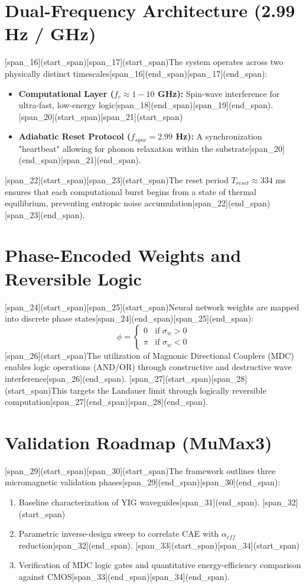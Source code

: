 \documentclass[11pt,a4paper]{article}
\begin{document}
\section{Dual-Frequency Architecture (2.99 Hz / GHz)}
[span_16](start_span)[span_17](start_span)The system operates across two physically distinct timescales[span_16](end_span)[span_17](end_span):
\begin{itemize}
    [span_18](start_span)[span_19](start_span)\item \textbf{Computational Layer ($f_{c} \approx 1-10$ GHz):} Spin-wave interference for ultra-fast, low-energy logic[span_18](end_span)[span_19](end_span).
    [span_20](start_span)[span_21](start_span)\item \textbf{Adiabatic Reset Protocol ($f_{sync} = 2.99$ Hz):} A synchronization "heartbeat" allowing for phonon relaxation within the substrate[span_20](end_span)[span_21](end_span).
\end{itemize}

[span_22](start_span)[span_23](start_span)The reset period $T_{reset} \approx 334$ ms ensures that each computational burst begins from a state of thermal equilibrium, preventing entropic noise accumulation[span_22](end_span)[span_23](end_span).

\section{Phase-Encoded Weights and Reversible Logic}
[span_24](start_span)[span_25](start_span)Neural network weights are mapped into discrete phase states[span_24](end_span)[span_25](end_span):
\begin{equation}
\phi = \begin{cases} 0 & \text{if } \sigma_{w} > 0 \\ \pi & \text{if } \sigma_{w} < 0 \end{cases}
\end{equation}
[span_26](start_span)The utilization of Magnonic Directional Couplers (MDC) enables logic operations (AND/OR) through constructive and destructive wave interference[span_26](end_span). [span_27](start_span)[span_28](start_span)This targets the Landauer limit through logically reversible computation[span_27](end_span)[span_28](end_span).

\section{Validation Roadmap (MuMax3)}
[span_29](start_span)[span_30](start_span)The framework outlines three micromagnetic validation phases[span_29](end_span)[span_30](end_span):
\begin{enumerate}
    [span_31](start_span)\item Baseline characterization of YIG waveguides[span_31](end_span).
    [span_32](start_span)\item Parametric inverse-design sweep to correlate CAE with $\alpha_{eff}$ reduction[span_32](end_span).
    [span_33](start_span)[span_34](start_span)\item Verification of MDC logic gates and quantitative energy-efficiency comparison against CMOS[span_33](end_span)[span_34](end_span).
\end{enumerate}
\end{document}
